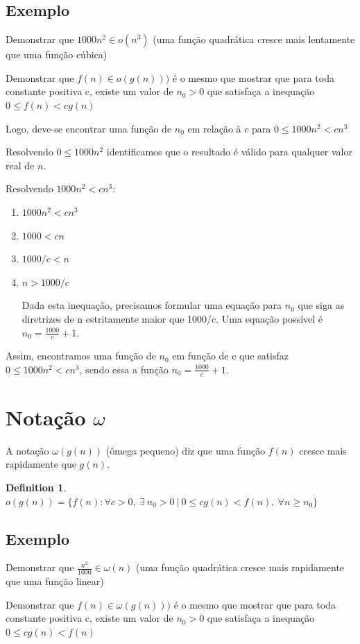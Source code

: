 \documentclass[ a4paper, twocolumn]{article}
\theoremstyle{definition}
\newtheorem{definition}{Definition}[section]
\begin{document}
\subsection{Exemplo}
Demonstrar que $1000n^2 \in o(n^3)$ (uma função quadrática cresce mais lentamente que uma função cúbica)

Demonstrar que $f(n) \in o(g(n)))$ é o mesmo que mostrar que para toda constante positiva c, existe um valor de $n_0 > 0$ que satisfaça a inequação $0 \leq f(n) < cg(n)$

Logo, deve-se encontrar uma função de $n_0$ em relação à $c$ para $0 \leq 1000n^2 < cn^3$

Resolvendo $0 \leq 1000n^2$ identificamos que o resultado é válido para qualquer valor real de $n$.

Resolvendo $1000n^2 < cn^3$:

\begin{enumerate}[Step 1:]
	\item $1000n^2 < cn^3$
	\item $1000 < cn$	
	\item $1000/c < n$
	\item $n > 1000/c$
	
	Dada esta inequação, precisamos formular uma equação para $n_0$ que siga as diretrizes de n estritamente maior que 1000/c. Uma equação possível é $n_0 = \frac{1000}{c} + 1$.
\end{enumerate}
Assim, encontramos uma função de $n_0$ em função de c que satisfaz $0 \leq 1000n^2 < cn^3$, sendo essa a função $n_0 = \frac{1000}{c} + 1$.

\section{Notação $\omega$}
A notação $\omega(g(n))$ (ômega pequeno)  diz que uma função $f(n)$ cresce mais rapidamente que $g(n)$.

\begin{definition}
	$o(g(n)) = \{f(n): \forall c>0, \ \exists \ n_0 > 0 \ | \ 0 \leq cg(n) < f(n), \ \forall n \geq n_0 \}$
\end{definition} 

\subsection{Exemplo}
Demonstrar que $\frac{n^2}{1000} \in \omega(n)$ (uma função quadrática cresce mais rapidamente que uma função linear)

Demonstrar que $f(n) \in \omega(g(n)))$ é o mesmo que mostrar que para toda constante positiva c, existe um valor de $n_0 > 0$ que satisfaça a inequação $0 \leq cg(n) < f(n)$
\end{document}

